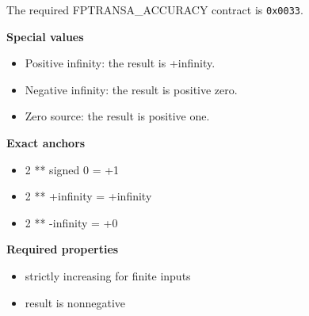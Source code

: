 The required FPTRANSA\_ACCURACY contract is \texttt{0x0033}.

\textbf{Special values}\par
\begin{itemize}
\item Positive infinity: the result is +infinity.
\item Negative infinity: the result is positive zero.
\item Zero source: the result is positive one.
\end{itemize}

\textbf{Exact anchors}\par
\begin{itemize}
\item 2 ** signed 0 = +1
\item 2 ** +infinity = +infinity
\item 2 ** -infinity = +0
\end{itemize}

\textbf{Required properties}\par
\begin{itemize}
\item strictly increasing for finite inputs
\item result is nonnegative
\end{itemize}
